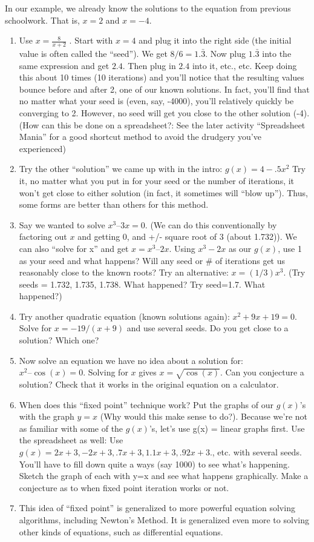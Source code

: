 In our example, we already know the solutions to the equation from previous schoolwork.  That is, $x = 2$ and $x = - 4$.
\begin{enumerate}
\item Use $x=\frac{8}{x+2}$ .  Start with $x = 4$ and plug it into the right side (the initial value is often called the ``seed'').  We get $8/6= 1.\bar{3}$.  Now plug $1.\bar{3}$ into the same expression and get $2.4$.  Then plug in $2.4$ into it, etc., etc.  Keep doing this about 10 times (10 iterations) and you'll notice that the resulting values bounce before and after 2, one of our known solutions.  In fact, you'll find that no matter what your seed is (even, say, -4000), you'll relatively quickly be converging to 2.  However, no seed will get you close to the other solution (-4).  (How can this be done on a spreadsheet?: See the later activity ``Spreadsheet Mania'' for a good shortcut method to avoid the drudgery you've experienced)
\item Try the other ``solution'' we came up with in the intro:  $g(x) = 4-.5x^2$  Try it, no matter what you put in for your seed or the number of iterations, it won't get close to either solution (in fact, it sometimes will ``blow up'').  Thus, some forms are better than others for this method.
\item Say we wanted to solve $x^3 – 3x = 0$.  (We can do this
conventionally by factoring out $x$ and getting $0$, and +/- square root
of 3 (about 1.732)).  We can also ``solve for x'' and get $x = x^3 –
2x$.  Using $x^3-2x$ as our $g(x)$, use 1 as your seed and what happens?
Will any seed or \# of iterations get us reasonably close to the known
roots?  Try an alternative: $x = (1/3)x^3$. (Try seeds = 1.732, 1.735,
1.738.  What happened?  Try seed=1.7.  What happened?)  

\item Try another quadratic equation (known solutions again): $x^2+9x+19 = 0$.  Solve for $x = -19/(x+9)$ and use several seeds.  Do you get close to a solution?
Which one?  

\item Now solve an equation we have no idea about a solution
for: $x^2 – \cos(x) = 0.$  Solving for $x$ gives $x = \sqrt{\cos(x)}$.  Can you
conjecture a solution?  Check that it works in the original equation
on a calculator. 
\item When does this ``fixed point'' technique work?
Put the graphs of our $g(x)$'s with the graph $y=x$ (Why would this make
sense to do?).  Because we're not as familiar with some of the $g(x)$'s,
let's use g(x) = linear graphs first.  Use the spreadsheet as well:
Use $g(x) = 2x +3, -2x + 3, .7x + 3, 1.1x +3, .92x + 3$., etc. with
several seeds.  You'll have to fill down quite a ways (say 1000) to
see what's happening.  Sketch the graph of each with y=x and see what
happens graphically.  Make a conjecture as to when fixed point
iteration works or not.  

\item This idea of ``fixed point'' is
generalized to more powerful equation solving algorithms, including
Newton's Method.  It is generalized even more to solving other kinds
of equations, such as differential equations.
\end{enumerate}
